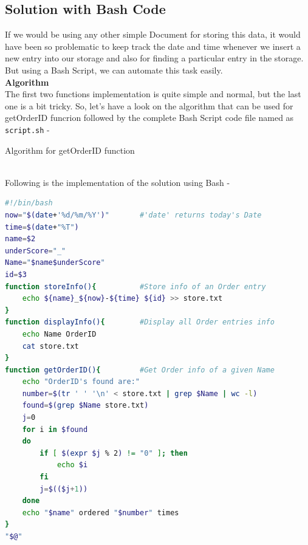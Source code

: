 \documentclass[12pt]{article}
\begin{document}
\subsection{Solution with Bash Code}
If we would be using any other simple Document for storing this data, it would have been so problematic to keep track the date and time whenever we insert a new entry into our storage and also for finding a particular entry in the storage. But using a Bash Script, we can automate this task easily. \vspace{1 em} \\
\textbf{\large Algorithm} \vspace{1 ex} \\
The first two functions implementation is quite simple and normal, but the last one is a bit tricky. So, let's have a look on the algorithm that can be used for getOrderID funcrion followed by the complete Bash Script code file named as \texttt{script.sh} - 
\begin{algorithm}[hbt!]
\SetAlgoLined
{}
\caption{Algorithm for getOrderID function}
\end{algorithm} \\
Following is the implementation of the solution using Bash - 
\begin{lstlisting}[language=bash,caption=Bash Script]
#!/bin/bash
now="$(date+'%d/%m/%Y')"       #'date' returns today's Date
time=$(date+"%T")
name=$2
underScore="_"
Name="$name$underScore"
id=$3
function storeInfo(){          #Store info of an Order entry 
    echo ${name}_${now}-${time} ${id} >> store.txt
}
function displayInfo(){        #Display all Order entries info
    echo Name OrderID
    cat store.txt
}
function getOrderID(){         #Get Order info of a given Name
    echo "OrderID's found are:"
    number=$(tr ' ' '\n' < store.txt | grep $Name | wc -l)
    found=$(grep $Name store.txt)
    j=0
    for i in $found
    do
        if [ $(expr $j % 2) != "0" ]; then
            echo $i
        fi 
        j=$(($j+1))
    done
    echo "$name" ordered "$number" times
}
"$@"
\end{lstlisting}
\end{document}
